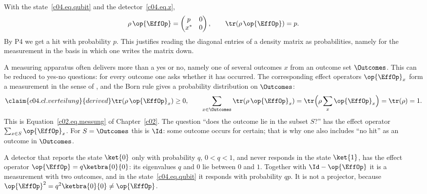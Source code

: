 \begin{example}\label{c04.ex.born}
  With the state~\eqref{c04.eq.qubit} and the detector~\eqref{c04.eq.z},
  \begin{equation}\label{c04.eq.born-z}
    \rho\,\op{\EffOp} = \begin{pmatrix} p & 0 \\ x^* & 0 \end{pmatrix} ,
    \qquad
    \tr(\rho\,\op{\EffOp}) = p .
  \end{equation}
  By P4 we get a hit with probability $p$. This justifies reading the diagonal entries of a
  density matrix as probabilities, namely for the measurement in the basis in which one writes
  the matrix down.
\end{example}

A measuring apparatus often delivers more than a yes or no, namely one of several outcomes $x$
from an outcome set $\Outcomes$. This can be reduced to yes-no questions: for every outcome one
asks whether it has occurred. The corresponding effect operators $\op{\EffOp}_x$ form a
measurement in the sense of , and the Born rule gives a probability distribution on
$\Outcomes$:
\begin{equation}\label{c04.eq.verteilung}\claim{c04.cl.verteilung}{derived}
  \tr(\rho\,\op{\EffOp}_x) \geq 0 ,
  \qquad
  \sum_{x \in \Outcomes} \tr(\rho\,\op{\EffOp}_x) = \tr\Bigl(\rho \sum_{x} \op{\EffOp}_x\Bigr) = \tr(\rho) = 1 .
\end{equation}
This is Equation~\eqref{c02.eq.messung} of Chapter~\ref{c02}. The question ``does the outcome lie
in the subset $S$?'' has the effect operator $\sum_{x \in S} \op{\EffOp}_x$. For $S = \Outcomes$
this is $\Id$: some outcome occurs for certain; that is why one also includes ``no hit'' as an
outcome in $\Outcomes$.

\begin{example}\label{c04.ex.wirkungsgrad}
  A detector that reports the state $\ket{0}$ only with probability $q$, $0 < q < 1$, and never
  responds in the state $\ket{1}$, has the effect operator $\op{\EffOp} = q\ketbra{0}{0}$: its
  eigenvalues $q$ and $0$ lie between $0$ and $1$. Together with $\Id - \op{\EffOp}$ it is a
  measurement with two outcomes, and in the state~\eqref{c04.eq.qubit} it responds with
  probability $q p$. It is not a projector, because $\op{\EffOp}^2 = q^2 \ketbra{0}{0} \neq \op{\EffOp}$.
\end{example}

